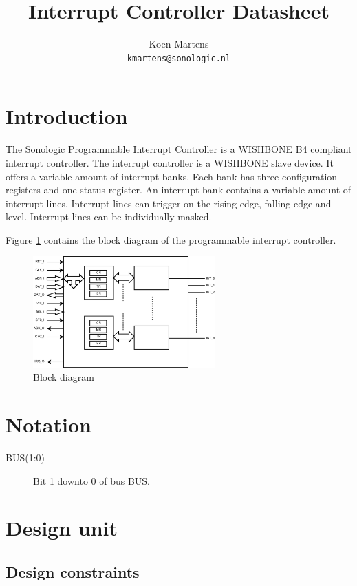 \documentclass[a4paper,twocolumn,12pt]{article}
\title{Interrupt Controller Datasheet}
\author{Koen Martens\\
        \texttt{kmartens@sonologic.nl}}
\begin{document}
\maketitle

\section{Introduction}

The Sonologic Programmable Interrupt Controller is a WISHBONE B4 \cite{wishbone} compliant interrupt controller. The interrupt controller is a WISHBONE slave device. It offers a variable amount of interrupt banks. Each bank has three configuration registers and one status register. An interrupt bank contains a variable amount of interrupt lines. Interrupt lines can trigger on the rising edge, falling edge and level. Interrupt lines can be individually masked.

Figure \ref{fig:block_diagram} contains the block diagram of the programmable interrupt controller. 

\begin{figure}[h]
    \centering
    \includegraphics[width=7cm]{pic_block_diagram}
    \caption{Block diagram}
    \label{fig:block_diagram}
\end{figure}

\section{Notation}

\begin{description}
    \item[BUS(1:0)] Bit 1 downto 0 of bus BUS.
\end{description}

\section{Design unit}

\subsection{Design constraints}
\end{document}
